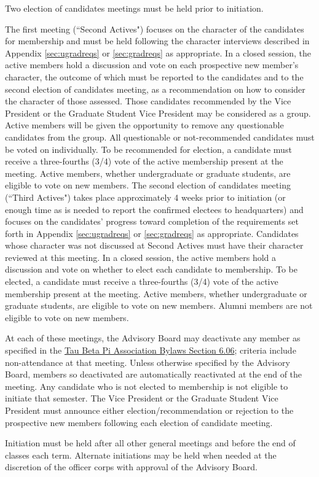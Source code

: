 \begin{enumsubsection}
\itemnotoc Two election of candidates meetings must be held prior to initiation.
\begin{enumsubsubsection}
\itemnotoc The first meeting (``Second Actives") focuses on the character of the candidates for membership and must be held following the character interviews described in Appendix \ref{sec:ugradreqs} or \ref{sec:gradreqs} as appropriate. %
In a closed session, the active members  hold a discussion and vote on each prospective new member's character, the outcome of which must be reported to the candidates and to the second election of candidates meeting, as a recommendation on how to consider the character of those assessed.  Those candidates recommended by the Vice President or the Graduate Student Vice President may be considered as a group.  Active members will be given the opportunity to remove any questionable candidates from the group.  All questionable or not-recommended candidates must be voted on individually.  To be recommended for election, a candidate must receive a three-fourths (3/4) vote of the active membership present at the meeting.   Active members, whether undergraduate or graduate students, are eligible to vote on new members.%
\itemnotoc The second election of candidates meeting (``Third Actives") takes place approximately 4 weeks prior to initiation (or enough time as is needed to report the confirmed electees to headquarters) and focuses on the candidates' progress toward completion of the requirements set forth in Appendix \ref{sec:ugradreqs} or \ref{sec:gradreqs} as appropriate. %
 Candidates whose character was not discussed at Second Actives must have their character reviewed at this meeting. In a closed session, the active members hold a discussion and vote on whether to elect each candidate to membership.  To be elected, a candidate must receive a three-fourths (3/4) vote of the active membership present at the meeting.   Active members, whether undergraduate or graduate students, are eligible to vote on new members. Alumni members are not eligible to vote on new members.
\end{enumsubsubsection}
At each of these meetings, the Advisory Board may deactivate any member as specified in the  \href{http://www.tbp.org/off/ConstBylaw.pdf}{Tau Beta Pi Association Bylaws Section 6.06}; criteria include non-attendance at that meeting. Unless otherwise specified by the Advisory Board,
members so deactivated are automatically reactivated at the end of the meeting.
\itemnotoc Any candidate who is not elected to membership is not eligible to initiate that semester.
\itemnotoc  The Vice President or the Graduate Student Vice President must announce either election/recommendation or rejection to the prospective new members following each election of candidate meeting.

\itemnotoc Initiation must be held after all other general meetings and before the end of classes each term. Alternate initiations may be held when needed at the discretion of the officer corps with approval of the Advisory Board.
\end{enumsubsection}

